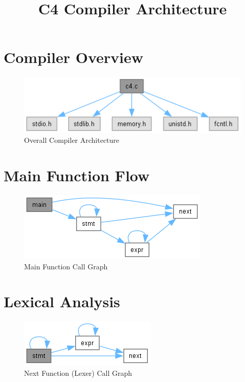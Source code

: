 \documentclass{article}
\title{C4 Compiler Architecture}
\author{}
\date{}
\begin{document}
\maketitle

\section{Compiler Overview}
\begin{figure}[h]
    \centering
    \includegraphics[width=\textwidth]{html/c4_8c__incl}
    \caption{Overall Compiler Architecture}
\end{figure}

\section{Main Function Flow}
\begin{figure}[h]
    \centering
    \includegraphics[width=\textwidth]{html/c4_8c_a3c04138a5bfe5d72780bb7e82a18e627_cgraph}
    \caption{Main Function Call Graph}
\end{figure}

\section{Lexical Analysis}
\begin{figure}[h]
    \centering
    \includegraphics[width=\textwidth]{html/c4_8c_a1bbf17561fdc517f5c69b8887f29ffc8_cgraph}
    \caption{Next Function (Lexer) Call Graph}
\end{figure}
\end{document}

